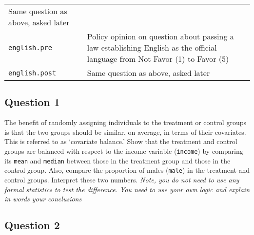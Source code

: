 \documentclass[]{article}
\begin{document}
\begin{longtable}[]{@{}ll@{}}
\begin{minipage}[t]{0.68\columnwidth}
Same question as above, asked later\strut
\end{minipage}\tabularnewline
\begin{minipage}[t]{0.25\columnwidth}\raggedright\strut
\texttt{english.pre}\strut
\end{minipage} & \begin{minipage}[t]{0.68\columnwidth}\raggedright\strut
Policy opinion on question about passing a law establishing English as
the official language from Not Favor (1) to Favor (5)\strut
\end{minipage}\tabularnewline
\begin{minipage}[t]{0.25\columnwidth}\raggedright\strut
\texttt{english.post}\strut
\end{minipage} & \begin{minipage}[t]{0.68\columnwidth}\raggedright\strut
Same question as above, asked later\strut
\end{minipage}\tabularnewline
\bottomrule
\end{longtable}

\subsection{Question 1}\label{question-1}

The benefit of randomly assigning individuals to the treatment or
control groups is that the two groups should be similar, on average, in
terms of their covariates. This is referred to as `covariate balance.'
Show that the treatment and control groups are balanced with respect to
the income variable (\texttt{income}) by comparing its \texttt{mean} and
\texttt{median} between those in the treatment group and those in the
control group. Also, compare the proportion of males (\texttt{male}) in
the treatment and control groups. Interpret these two numbers.
\emph{Note, you do not need to use any formal statistics to test the
difference. You need to use your own logic and explain in words your
conclusions}

\subsection{Question 2}\label{question-2}
\end{document}
